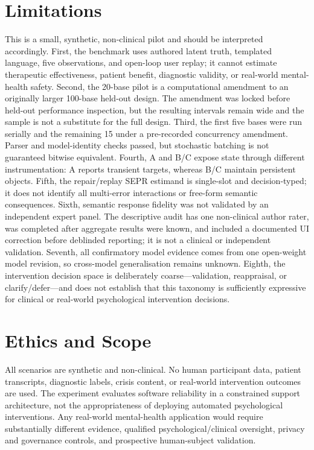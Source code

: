 \documentclass[10pt]{article}
\begin{document}
\section{Limitations}
This is a small, synthetic, non-clinical pilot and should be interpreted accordingly. First, the benchmark uses authored latent truth, templated language, five observations, and open-loop user replay; it cannot estimate therapeutic effectiveness, patient benefit, diagnostic validity, or real-world mental-health safety. Second, the 20-base pilot is a computational amendment to an originally larger 100-base held-out design. The amendment was locked before held-out performance inspection, but the resulting intervals remain wide and the sample is not a substitute for the full design. Third, the first five bases were run serially and the remaining 15 under a pre-recorded concurrency amendment. Parser and model-identity checks passed, but stochastic batching is not guaranteed bitwise equivalent. Fourth, A and B/C expose state through different instrumentation: A reports transient targets, whereas B/C maintain persistent objects. Fifth, the repair/replay SEPR estimand is single-slot and decision-typed; it does not identify all multi-error interactions or free-form semantic consequences. Sixth, semantic response fidelity was not validated by an independent expert panel. The descriptive audit has one non-clinical author rater, was completed after aggregate results were known, and included a documented UI correction before deblinded reporting; it is not a clinical or independent validation. Seventh, all confirmatory model evidence comes from one open-weight model revision, so cross-model generalisation remains unknown. Eighth, the intervention decision space is deliberately coarse---validation, reappraisal, or clarify/defer---and does not establish that this taxonomy is sufficiently expressive for clinical or real-world psychological intervention decisions.

\section{Ethics and Scope}
All scenarios are synthetic and non-clinical. No human participant data, patient transcripts, diagnostic labels, crisis content, or real-world intervention outcomes are used. The experiment evaluates software reliability in a constrained support architecture, not the appropriateness of deploying automated psychological interventions. Any real-world mental-health application would require substantially different evidence, qualified psychological/clinical oversight, privacy and governance controls, and prospective human-subject validation.
\end{document}
